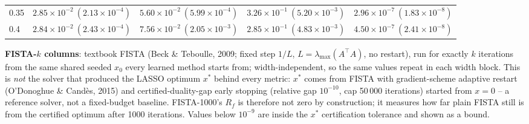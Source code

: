 \begin{table}[htbp]
\begin{tabular}{@{} l rrrr @{}}
0.35 & $2.85\!\times\!10^{-2}\ (2.13\!\times\!10^{-4})$ & $5.60\!\times\!10^{-2}\ (5.99\!\times\!10^{-4})$ & $3.26\!\times\!10^{-1}\ (5.20\!\times\!10^{-3})$ & $2.96\!\times\!10^{-7}\ (1.83\!\times\!10^{-8})$ \\
0.4 & $2.84\!\times\!10^{-2}\ (2.43\!\times\!10^{-4})$ & $7.56\!\times\!10^{-2}\ (2.05\!\times\!10^{-3})$ & $2.85\!\times\!10^{-1}\ (4.83\!\times\!10^{-3})$ & $4.50\!\times\!10^{-7}\ (2.41\!\times\!10^{-8})$ \\
\bottomrule
\end{tabular}
\vspace{2pt}
\begin{minipage}{\linewidth}\footnotesize
\textbf{FISTA-$k$ columns}: textbook FISTA (Beck \& Teboulle, 2009; fixed step $1/L$, $L = \lambda_{\max}(A^\top A)$, no restart), run for exactly $k$ iterations from the same shared seeded $x_0$ every learned method starts from; width-independent, so the same values repeat in each width block. This is \emph{not} the solver that produced the LASSO optimum $x^*$ behind every metric: $x^*$ comes from FISTA with gradient-scheme adaptive restart (O'Donoghue \& Cand\`es, 2015) and certified-duality-gap early stopping (relative gap $10^{-10}$, cap 50\,000 iterations) started from $x = 0$ -- a reference solver, not a fixed-budget baseline. FISTA-1000's $R_f$ is therefore not zero by construction; it measures how far plain FISTA still is from the certified optimum after 1000 iterations. Values below $10^{-9}$ are inside the $x^*$ certification tolerance and shown as a bound.
\end{minipage}
\end{table}

